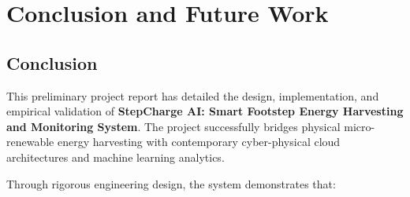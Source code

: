 \chapter{Conclusion and Future Work}

\section{Conclusion}
This preliminary project report has detailed the design, implementation, and empirical validation of \textbf{StepCharge AI: Smart Footstep Energy Harvesting and Monitoring System}. The project successfully bridges physical micro-renewable energy harvesting with contemporary cyber-physical cloud architectures and machine learning analytics.

Through rigorous engineering design, the system demonstrates that:
